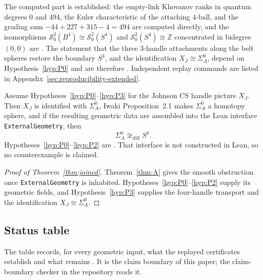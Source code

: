 \begin{remark}[Status of P3]
The computed part is established: the empty-link Khovanov ranks in quantum
degrees $0$ and $494$, the Euler characteristic of the attaching $4$-ball,
and the grading sum $-44+227+315-4=494$ are computed directly, and the
isomorphisms $\mathcal S^2_0(B^4)\cong\mathcal S^2_0(S^4)$ and
$\mathcal S^2_0(S^4)\cong\mathbb Z$ concentrated in bidegree $(0,0)$ are
\cite[Proposition~3.4 and Corollary~3.5]{ManolescuWalkerWedrich2023}.
The statement that the three $3$-handle attachments along the belt spheres
restore the boundary $S^3$, and the identification $X_J\cong\Sigma_A^0$,
depend on Hypothesis~\ref{hyp:P0} and are therefore \Open.  Independent
replay commands are listed in Appendix~\ref{sec:reproducibility-extended}.
\end{remark}

\begin{theorem}\label{thm:joined}
Assume Hypotheses~\ref{hyp:P0}--\ref{hyp:P3} for the Johnson CS handle
picture $X_J$.  Then $X_J$ is identified with $\Sigma_A^0$, Iwaki
Proposition~2.1 makes $\Sigma_A^0$ a homotopy sphere, and if the resulting
geometric data are assembled into the Lean interface
\texttt{ExternalGeometry}, then
\[
\Sigma_A^0\not\cong_{\mathrm{diff}}S^4.
\]
Hypotheses~\ref{hyp:P0}--\ref{hyp:P2} are \Open.
That interface is not constructed in Lean, so no counterexample is claimed.
\end{theorem}

\begin{proof}[Proof of Theorem~\ref{thm:joined}]
Theorem~\ref{thm:A} gives the smooth obstruction once
\texttt{ExternalGeometry} is inhabited.  Hypotheses~\ref{hyp:P0}--\ref{hyp:P2}
supply its geometric fields, and Hypothesis~\ref{hyp:P3} supplies the
four-handle transport and the identification $X_J\cong\Sigma_A^0$.
\end{proof}

\subsection{Status table}\label{sec:status-table}

The table records, for every geometric input, what the replayed
certificates establish and what remains \Open.  It is the claim boundary of
this paper; the claim-boundary checker in the repository reads it.

